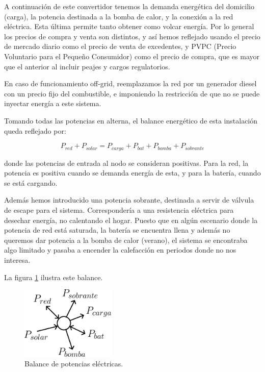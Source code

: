 A continuación de este convertidor tenemos la demanda energética del domicilio
(carga), la potencia destinada a la bomba de calor, y la conexión a la red
eléctrica. Esta última permite tanto obtener como volcar energía. Por lo
general los precios de compra y venta son distintos, y así hemos reflejado
usando el precio de mercado diario como el precio de venta de excedentes, y
PVPC (Precio Voluntario para el Pequeño Consumidor) como el precio de compra,
que es mayor que el anterior al incluir peajes y cargos regulatorios.

En caso de funcionamiento off-grid, reemplazamos la red por un generador
diesel con un precio fijo del combustible, e imponiendo la restricción de que
no se puede inyectar energía a este sistema.

Tomando todas las potencias en alterna, el balance energético de esta
instalación queda reflejado por:

\begin{equation} \label{eq:power_balance}
	P_{red} + P_{solar} = P_{carga} + P_{bat} + P_{bomba} + P_{sobrante}
\end{equation}

donde las potencias de entrada al nodo se consideran positivas. Para la red, la
potencia es positiva cuando se demanda energía de esta, y para la batería,
cuando se está cargando.

Además hemos introducido una potencia sobrante, destinada a servir de válvula
de escape para el sistema. Correspondería a una resistencia eléctrica para
desechar energía, no calentando el hogar. Puesto que en algún escenario donde
la potencia de red está saturada, la batería se encuentra llena y además no
queremos dar potencia a la bomba de calor (verano), el sistema se encontraba
algo limitado y pasaba a encender la calefacción en periodos donde no nos
interesa.

La figura \ref{fig:electric_node} ilustra este balance.

\begin{figure}[h] \centering
	\centering
	\includegraphics[width=0.4\textwidth]{./capitulos/resultados_discusion/images/electric_node.png}
	\caption{Balance de potencias eléctricas.}
	\label{fig:electric_node}
\end{figure}

